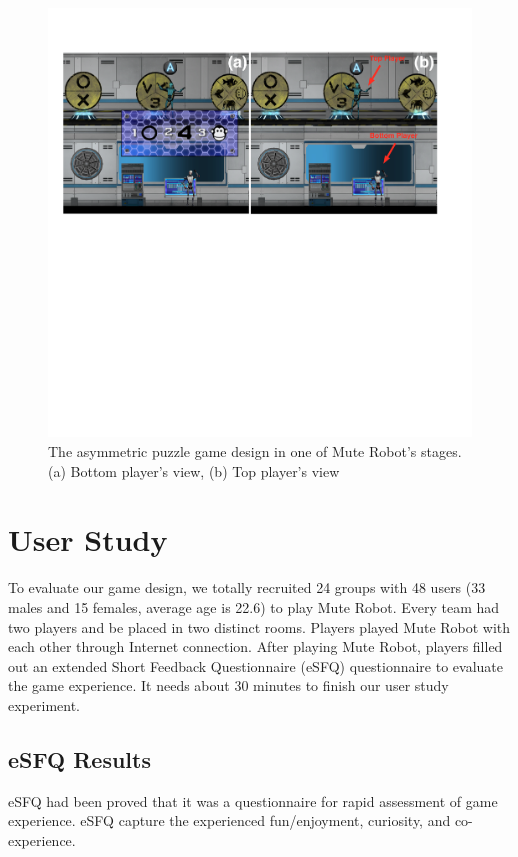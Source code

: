 \documentclass{sigchi}
\begin{document}
\begin{figure}[!h]
\centering
\includegraphics[width=1.0\columnwidth]{Figures/GD_F2.pdf}
\caption{The asymmetric puzzle game design in one of Mute Robot's stages. (a) Bottom player's view, (b) Top player's view}
\label{fig:GD_F2}
\end{figure}

\section{User Study}

To evaluate our game design, we totally recruited 24 groups with 48 users (33 males and 15 females, average age is 22.6) to play Mute Robot.  Every team had two players and be placed in two distinct rooms. Players played Mute Robot with each other through Internet connection. After playing Mute Robot, players filled out an extended Short Feedback Questionnaire (eSFQ) \cite{eSFQ} questionnaire to evaluate the game experience. It needs about 30 minutes to finish our user study experiment. 

\subsection{eSFQ Results}

eSFQ \cite{eSFQ} had been proved that it was a questionnaire for rapid assessment of game experience. eSFQ capture the experienced fun/enjoyment, curiosity, and co-experience. 
\end{document}
